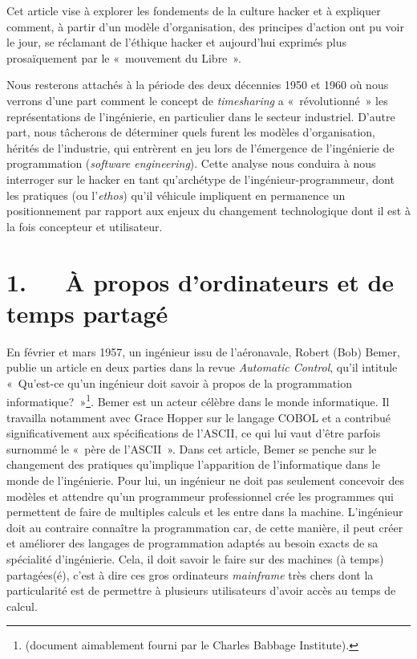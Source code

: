 \documentclass{FramateX}
\begin{document}
\begin{refsection}
Cet article vise à explorer les fondements de la culture hacker et à
expliquer comment, à partir d'un modèle
d'organisation, des principes
d'action ont pu voir le jour, se réclamant de
l'éthique hacker et aujourd'hui
exprimés plus prosaïquement par le «~mouvement du Libre~».

Nous resterons attachés à la période des deux décennies 1950 et 1960 où
nous verrons d'une part comment le concept de
\textit{timesharing} a «~révolutionné~» les représentations de
l'ingénierie, en particulier dans le secteur
industriel. D'autre part, nous tâcherons de déterminer
quels furent les modèles d'organisation, hérités de
l'industrie, qui entrèrent en jeu lors de l'émergence
de l'ingénierie de programmation (\textit{software
engineering}). Cette analyse nous conduira à nous interroger sur le
hacker en tant qu'archétype de
l'ingénieur-programmeur, dont les pratiques (ou
l'\textit{ethos}) qu'il véhicule impliquent en
permanence un positionnement par rapport aux enjeux du changement
technologique dont il est à la fois concepteur et utilisateur.

\section*{1.~~~À propos d'ordinateurs et de temps partagé}
{}

En février et mars 1957, un ingénieur issu de l'aéronavale, Robert (Bob)
Bemer, publie un article en deux parties dans la revue
\textit{Automatic Control}, qu'il intitule «~Qu'est-ce qu'un ingénieur
doit savoir à propos de la programmation
informatique?~»\footnote{\cite{bemerwhy1957} (document aimablement fourni par le Charles Babbage
Institute).}. Bemer est un acteur célèbre dans le monde informatique.
Il travailla notamment avec Grace Hopper sur le langage COBOL et a
contribué significativement aux spécifications de l'ASCII, ce qui lui
vaut d'être parfois surnommé le «~père de l'ASCII~». Dans cet article,
Bemer se penche sur le changement des pratiques qu'implique
l'apparition de l'informatique dans le monde de l'ingénierie. Pour lui,
un ingénieur ne doit pas seulement concevoir des modèles et attendre
qu'un programmeur professionnel crée les programmes qui permettent de
faire de multiples calculs et les entre dans la machine. L'ingénieur
doit au contraire connaître la programmation car, de cette manière, il
peut créer et améliorer des langages de programmation adaptés au besoin
exacts de sa spécialité d'ingénierie. Cela, il doit savoir le faire sur
des machines (à temps) partagées(é), c'est à dire ces gros ordinateurs
\textit{mainframe} très chers dont la particularité est de permettre à
plusieurs utilisateurs d'avoir accès au temps de calcul.


\end{refsection}
\end{document}
